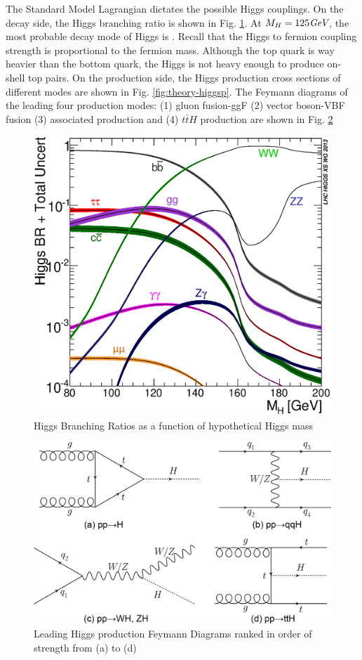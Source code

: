 The Standard Model Lagrangian dictates the possible Higgs couplings. On the decay side, the Higgs branching ratio is shown in Fig. \ref{fig:theory-higgsbr}. At $M_H = 125\textit{GeV}$, the most probable decay mode of Higgs is \Hbb. Recall that the Higgs to fermion coupling strength is proportional to the fermion mass. Although the top quark is way heavier than the bottom quark, the Higgs is not heavy enough to produce on-shell top pairs. On the production side, the Higgs production cross sections of different modes are shown in Fig. \ref{fig:theory-higgsp}. The Feymann diagrams of the leading four production modes: (1) gluon fusion-ggF (2) vector boson-VBF fusion (3) associated production and (4) $t\bar{t} H$ production are shown in Fig. \ref{fig:theory-higgsfeymann}


\begin{figure}[htpb!]
\begin{center}
  \includegraphics[width=0.45\linewidth]{figures/theory/Higgs_BR_LM.eps}
\caption{Higgs Branching Ratios as a function of hypothetical Higgs mass}
\label{fig:theory-higgsbr}
\end{center}
\end{figure}

\begin{figure}[htpb!]
\begin{center}
  \includegraphics[width=0.45\linewidth]{figures/theory/ProductionFeymann}
\caption{Leading Higgs production Feymann Diagrams ranked in order of strength from (a) to (d)}
\label{fig:theory-higgsfeymann}
\end{center}
\end{figure}


